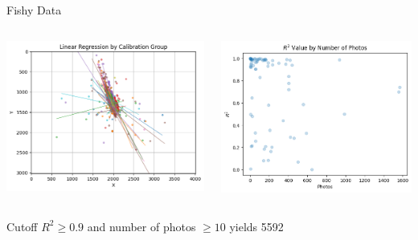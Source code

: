 \begin{frame}{Fishy Data}
    \begin{columns}
        \begin{column}{0.5\textwidth}
            \includegraphics[width=\linewidth,keepaspectratio]{images/regression.png}
        \end{column}
        \begin{column}{0.5\textwidth}
            \includegraphics[width=\linewidth,keepaspectratio]{images/rsquare.png}
        \end{column}
    \end{columns}

    \vspace{0.2em} %
    \begin{center}
        {\small Cutoff $R^2\geq 0.9$ and number of photos $\geq 10$ yields 5592}
    \end{center}
\end{frame}

